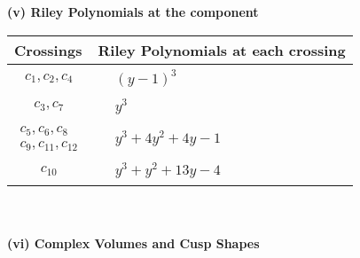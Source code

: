 \documentclass[1p]{elsarticle_modified}
\theoremstyle{definition}
\begin{document}
\newpage\renewcommand{\arraystretch}{1}
\flushleft \textbf{(v) Riley Polynomials at the component}\newline \\
\begin{tabular}{m{50pt}|m{274pt}}
Crossings & \hspace{64pt}Riley Polynomials at each crossing \\
\hline $$\begin{aligned}c_{1},c_{2},c_{4}\end{aligned}$$&$\begin{aligned}
&(y-1)^3
\end{aligned}$\\
\hline $$\begin{aligned}c_{3},c_{7}\end{aligned}$$&$\begin{aligned}
&y^3
\end{aligned}$\\
\hline $$\begin{aligned}c_{5},c_{6},c_{8}\\c_{9},c_{11},c_{12}\end{aligned}$$&$\begin{aligned}
&y^3+4 y^2+4 y-1
\end{aligned}$\\
\hline $$\begin{aligned}c_{10}\end{aligned}$$&$\begin{aligned}
&y^3+y^2+13 y-4
\end{aligned}$\\
\hline
\end{tabular}\\~\\
\newpage\flushleft \textbf{(vi) Complex Volumes and Cusp Shapes}
\end{document}
